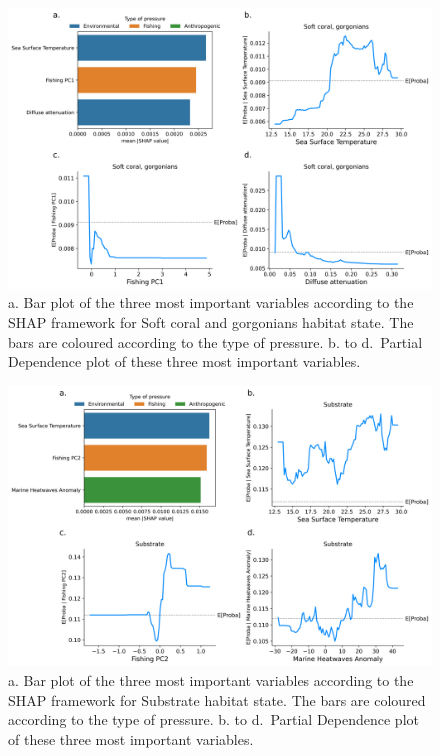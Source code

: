 \begin{figure}
\hypertarget{fig:chap3figS48}{%
\centering
\includegraphics{03-Chapitre3/figures/supplementary/04-pdp_Soft coral, gorgonians.png}
\caption{a. Bar plot of the three most important variables according to
the SHAP framework for Soft coral and gorgonians habitat state. The bars
are coloured according to the type of pressure. b. to d.~Partial
Dependence plot of these three most important
variables.}\label{fig:chap3figS48}
}
\end{figure}

\begin{figure}
\hypertarget{fig:chap3figS49}{%
\centering
\includegraphics{03-Chapitre3/figures/supplementary/04-pdp_Substrate.png}
\caption{a. Bar plot of the three most important variables according to
the SHAP framework for Substrate habitat state. The bars are coloured
according to the type of pressure. b. to d.~Partial Dependence plot of
these three most important variables.}\label{fig:chap3figS49}
}
\end{figure}

